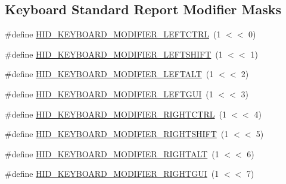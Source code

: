 \subsection*{Keyboard Standard Report Modifier Masks}
\begin{DoxyCompactItemize}
\item 
\#define \hyperlink{group__Group__USBClassHIDCommon_gaec79acb126b925705a9722242ee3fbf2}{H\+I\+D\+\_\+\+K\+E\+Y\+B\+O\+A\+R\+D\+\_\+\+M\+O\+D\+I\+F\+I\+E\+R\+\_\+\+L\+E\+F\+T\+C\+T\+RL}~(1 $<$$<$ 0)
\item 
\#define \hyperlink{group__Group__USBClassHIDCommon_gade816a1657d85c6285109abab106bc16}{H\+I\+D\+\_\+\+K\+E\+Y\+B\+O\+A\+R\+D\+\_\+\+M\+O\+D\+I\+F\+I\+E\+R\+\_\+\+L\+E\+F\+T\+S\+H\+I\+FT}~(1 $<$$<$ 1)
\item 
\#define \hyperlink{group__Group__USBClassHIDCommon_ga6c16a0a73dae854dec103967c3397cfd}{H\+I\+D\+\_\+\+K\+E\+Y\+B\+O\+A\+R\+D\+\_\+\+M\+O\+D\+I\+F\+I\+E\+R\+\_\+\+L\+E\+F\+T\+A\+LT}~(1 $<$$<$ 2)
\item 
\#define \hyperlink{group__Group__USBClassHIDCommon_gaad7300cb682e08ae139038f43ba9eb1a}{H\+I\+D\+\_\+\+K\+E\+Y\+B\+O\+A\+R\+D\+\_\+\+M\+O\+D\+I\+F\+I\+E\+R\+\_\+\+L\+E\+F\+T\+G\+UI}~(1 $<$$<$ 3)
\item 
\#define \hyperlink{group__Group__USBClassHIDCommon_gabcf18f1d58c68d4e0b636158407bd3c7}{H\+I\+D\+\_\+\+K\+E\+Y\+B\+O\+A\+R\+D\+\_\+\+M\+O\+D\+I\+F\+I\+E\+R\+\_\+\+R\+I\+G\+H\+T\+C\+T\+RL}~(1 $<$$<$ 4)
\item 
\#define \hyperlink{group__Group__USBClassHIDCommon_ga171aa0cc2375495b6cc3ac1f57ec7a1c}{H\+I\+D\+\_\+\+K\+E\+Y\+B\+O\+A\+R\+D\+\_\+\+M\+O\+D\+I\+F\+I\+E\+R\+\_\+\+R\+I\+G\+H\+T\+S\+H\+I\+FT}~(1 $<$$<$ 5)
\item 
\#define \hyperlink{group__Group__USBClassHIDCommon_gae68815069a3460dad0084741a8f118cc}{H\+I\+D\+\_\+\+K\+E\+Y\+B\+O\+A\+R\+D\+\_\+\+M\+O\+D\+I\+F\+I\+E\+R\+\_\+\+R\+I\+G\+H\+T\+A\+LT}~(1 $<$$<$ 6)
\item 
\#define \hyperlink{group__Group__USBClassHIDCommon_ga390f757b736eb0fef7ef3cbc80f46800}{H\+I\+D\+\_\+\+K\+E\+Y\+B\+O\+A\+R\+D\+\_\+\+M\+O\+D\+I\+F\+I\+E\+R\+\_\+\+R\+I\+G\+H\+T\+G\+UI}~(1 $<$$<$ 7)
\end{DoxyCompactItemize}
